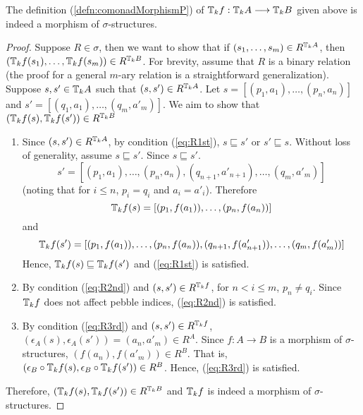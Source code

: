 \begin{prop}
The definition (\ref{defn:comonadMorphismP}) of ${\mathbb{T}_{k}f}:{\mathbb{T}_{k}A} \longrightarrow {\mathbb{T}_{k}B}$ given above is indeed a morphism of $\sigma$-structures. 
\begin{proof}
Suppose $R \in \sigma$, then we want to show that if $(s_{1},\dots,s_{m}) \in R^{{\mathbb{T}_{k}A}}$, then \linebreak $({\mathbb{T}_{k}f}(s_{1}),\dots,{\mathbb{T}_{k}f}(s_{m})) \in R^{{\mathbb{T}_{k}B}}$. For brevity, assume that $R$ is a binary relation (the proof for a general $m$-ary relation is a straightforward generalization). Suppose $s,s' \in {\mathbb{T}_{k}A}$ such that $(s,s') \in R^{{\mathbb{T}_{k}A}}$. Let $s = [(p_{1},a_{1}),\dots,(p_{n},a_{n})]$ and $s' = [(q_{1},a_{1}),\dots,(q_{m},a'_{m})]$. We aim to show that $({\mathbb{T}_{k}f}(s),{\mathbb{T}_{k}f}(s')) \in R^{{\mathbb{T}_{k}B}}$ \\
\begin{enumerate}
\item  Since $(s,s') \in R^{{\mathbb{T}_{k}A}}$, by condition (\ref{eq:R1st}), $s \sqsubseteq s'$ or $s' \sqsubseteq s$. Without loss of generality, assume $s \sqsubseteq s'$. Since $s \sqsubseteq s'$.
$$s' = [(p_{1},a_{1}),\dots,(p_{n},a_{n}),(q_{n+1},a'_{n+1}),\dots,(q_{m},a'_{m})]$$ 
(noting that for $i \leq n$, $p_{i} = q_{i}$ and $a_{i} = a'_{i}$). Therefore $${\mathbb{T}_{k}f}(s) = [(p_{1},f(a_{1})),\dots,(p_{n},f(a_{n}))]$$ 
and 
$${\mathbb{T}_{k}f}(s') =[(p_{1},f(a_{1})),\dots,(p_{n},f(a_{n})),(q_{n+1},f(a'_{n+1})), \dots,(q_{m},f(a'_{m}))]$$ 
Hence, ${\mathbb{T}_{k}f}(s) \sqsubseteq {\mathbb{T}_{k}f}(s')$ and (\ref{eq:R1st}) is satisfied. 
\item By condition (\ref{eq:R2nd}) and $(s,s') \in R^{{\mathbb{T}_{k}f}}$, for $n < i \leq m$, $p_{n} \not= q_{i}$. Since ${\mathbb{T}_{k}f}$ does not affect pebble indices, (\ref{eq:R2nd}) is satisfied.
\item  By condition (\ref{eq:R3rd}) and $(s,s') \in R^{{\mathbb{T}_{k}f}}$, $(\epsilon_{A}(s),\epsilon_{A}(s')) = (a_{n},a'_{m}) \in R^{A}$. Since $f:A \rightarrow B$ is a morphism of $\sigma$-structures, $(f(a_{n}),f(a'_{m})) \in R^{B}$. That is, $(\epsilon_{B}\circ {\mathbb{T}_{k}f}(s),\epsilon_{B} \circ {\mathbb{T}_{k}f}(s')) \in R^{B}$. Hence, (\ref{eq:R3rd}) is satisfied.
\end{enumerate}
Therefore, $({\mathbb{T}_{k}f}(s),{\mathbb{T}_{k}f}(s')) \in R^{{\mathbb{T}_{k}B}}$ and ${\mathbb{T}_{k}f}$ is indeed a morphism of $\sigma$-structures. 
\end{proof}
\end{prop}
